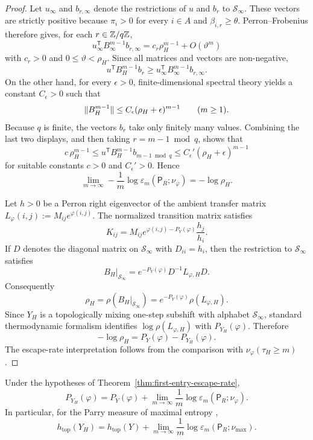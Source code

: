 \begin{proof}
Let \(u_\infty\) and \(b_{r,\infty}\) denote the restrictions of \(u\)
and \(b_r\) to \(\mathcal S_\infty\).  These vectors are strictly
positive because \(\pi_i>0\) for every \(i\in A\) and
\(\beta_{i,r}\geq \theta\).  Perron--Frobenius therefore gives, for each
\(r\in\mathbb{Z}/q\mathbb{Z}\),
\[
  u_\infty^{\mathsf T}B_\infty^{m-1}b_{r,\infty}
  = c_r\rho_H^{m-1}+O(\vartheta^m)
\]
with \(c_r>0\) and \(0\leq \vartheta<\rho_H\).  Since all matrices and
vectors are non-negative,
\[
  u^{\mathsf T}B_H^{m-1}b_r
  \geq
  u_\infty^{\mathsf T}B_\infty^{m-1}b_{r,\infty}.
\]
On the other hand, for every \(\epsilon>0\), finite-dimensional spectral
theory yields a constant \(C_\epsilon>0\) such that
\[
  \lVert B_H^{m-1}\rVert\leq C_\epsilon(\rho_H+\epsilon)^{m-1}
  \qquad (m\geq 1).
\]
Because \(q\) is finite, the vectors \(b_r\) take only finitely many
values.  Combining the last two displays, and then taking \(r=m-1\bmod
q\), shows that
\[
  c\,\rho_H^{m-1}
  \leq u^{\mathsf T}B_H^{m-1}b_{m-1\bmod q}
  \leq C_\epsilon'(\rho_H+\epsilon)^{m-1}
\]
for suitable constants \(c>0\) and \(C_\epsilon'>0\).  Hence
\[
  \lim_{m\to\infty}
  -\frac1m\log\varepsilon_m(\mathsf{P}_R;\nu_\varphi)
  = -\log\rho_H.
\]

Let \(h>0\) be a Perron right eigenvector of the ambient transfer matrix
\(L_\varphi(i,j):=M_{ij}e^{\varphi(i,j)}\).  The normalized transition
matrix satisfies
\[
  K_{ij}
  = M_{ij}e^{\varphi(i,j)-P_Y(\varphi)}\frac{h_j}{h_i}.
\]
If \(D\) denotes the diagonal matrix on \(\mathcal S_\infty\) with
\(D_{ii}=h_i\), then the restriction to \(\mathcal S_\infty\) satisfies
\[
  B_H|_{\mathcal S_\infty}=e^{-P_Y(\varphi)}D^{-1}L_{\varphi,H}D.
\]
Consequently
\[
  \rho_H
  = \rho(B_H|_{\mathcal S_\infty})
  = e^{-P_Y(\varphi)}\rho(L_{\varphi,H}).
\]
Since \(Y_H\) is a topologically mixing one-step subshift with alphabet
\(\mathcal S_\infty\), standard thermodynamic formalism identifies
\(\log\rho(L_{\varphi,H})\) with \(P_{Y_H}(\varphi)\).  Therefore
\[
  -\log\rho_H
  = P_Y(\varphi)-P_{Y_H}(\varphi).
\]
The escape-rate interpretation follows from the comparison with
\(\nu_\varphi(\tau_H\geq m)\).
\end{proof}

\begin{corollary}
\label{cor:survivor-pressure-recovery}
Under the hypotheses of
Theorem~\ref{thm:first-entry-escape-rate},
\[
  P_{Y_H}(\varphi)
  = P_Y(\varphi)
    + \lim_{m\to\infty}\frac1m
      \log \varepsilon_m(\mathsf{P}_R;\nu_\varphi).
\]
In particular, for the Parry measure of maximal entropy
\cite{Parry1964},
\[
  h_{\mathrm{top}}(Y_H)
  = h_{\mathrm{top}}(Y)
    + \lim_{m\to\infty}\frac1m
      \log \varepsilon_m(\mathsf{P}_R;\nu_{\max}).
\]
\end{corollary}

